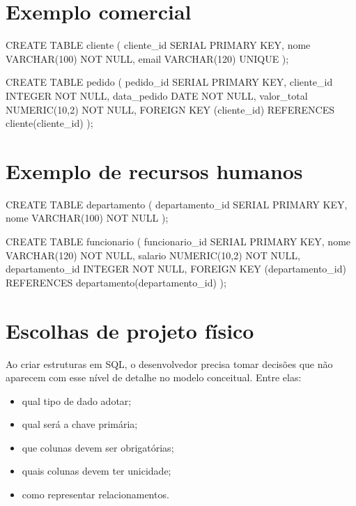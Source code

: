 \section{Exemplo comercial}

\begin{sqlcode}
CREATE TABLE cliente (
    cliente_id SERIAL PRIMARY KEY,
    nome VARCHAR(100) NOT NULL,
    email VARCHAR(120) UNIQUE
);
\end{sqlcode}

\begin{sqlcode}
CREATE TABLE pedido (
    pedido_id SERIAL PRIMARY KEY,
    cliente_id INTEGER NOT NULL,
    data_pedido DATE NOT NULL,
    valor_total NUMERIC(10,2) NOT NULL,
    FOREIGN KEY (cliente_id) REFERENCES cliente(cliente_id)
);
\end{sqlcode}

\section{Exemplo de recursos humanos}

\begin{sqlcode}
CREATE TABLE departamento (
    departamento_id SERIAL PRIMARY KEY,
    nome VARCHAR(100) NOT NULL
);
\end{sqlcode}

\begin{sqlcode}
CREATE TABLE funcionario (
    funcionario_id SERIAL PRIMARY KEY,
    nome VARCHAR(120) NOT NULL,
    salario NUMERIC(10,2) NOT NULL,
    departamento_id INTEGER NOT NULL,
    FOREIGN KEY (departamento_id) REFERENCES departamento(departamento_id)
);
\end{sqlcode}

\section{Escolhas de projeto físico}

Ao criar estruturas em SQL, o desenvolvedor precisa tomar decisões que não aparecem com esse nível de detalhe no modelo conceitual. Entre elas:

\begin{itemize}
    \item qual tipo de dado adotar;
    \item qual será a chave primária;
    \item que colunas devem ser obrigatórias;
    \item quais colunas devem ter unicidade;
    \item como representar relacionamentos.
\end{itemize}

